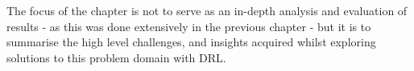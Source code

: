 \documentclass[ %
                    author={Ashwinder Khurana},
                supervisor={Prof Dave Cliff},
                    degree={MEng},
                     title={The Deeply Reinforced Trader},
                  subtitle={},
                      type={enterprise},
                      year={2020} ]{dissertation}
\begin{document}
{%
%
%
The focus of the chapter is not to serve as an in-depth analysis and evaluation of results - as this was done extensively in the previous chapter - but it is to summarise the high level challenges, and insights acquired whilst exploring solutions to this problem domain with DRL.

}
\end{document}
